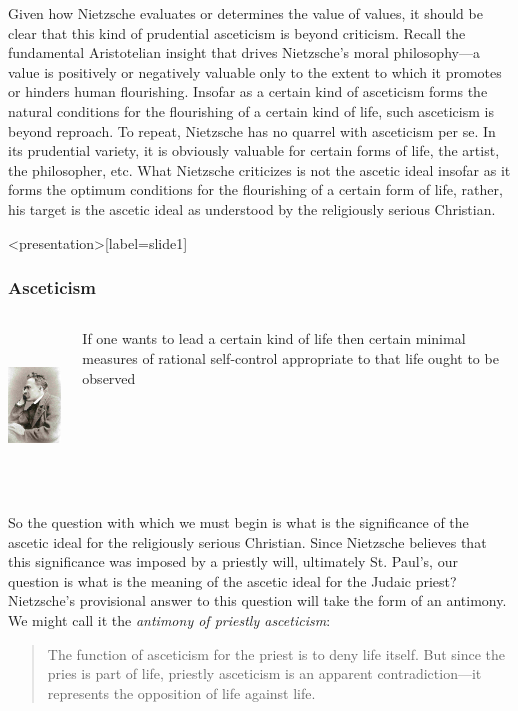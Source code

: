 Given how Nietzsche evaluates or determines the value of values, it should be clear that this kind of prudential asceticism is beyond criticism. Recall the fundamental Aristotelian insight that drives Nietzsche's moral philosophy---a value is positively or negatively valuable only to the extent to which it promotes or hinders human flourishing. Insofar as a certain kind of asceticism forms the natural conditions for the flourishing of a certain kind of life, such asceticism is beyond reproach. To repeat, Nietzsche has no quarrel with asceticism per se. In its prudential variety, it is obviously valuable for certain forms of life, the artist, the philosopher, etc. What Nietzsche criticizes is not the ascetic ideal insofar as it forms the optimum conditions for the flourishing of a certain form of life, rather, his target is the ascetic ideal as understood by the religiously serious Christian. \change

\begin{frame}<presentation>[label=slide1]
    \frametitle{Asceticism}
        \begin{columns}
            \begin{column}{3cm}
                \includegraphics[height=4cm]{../../graphics/nietzsche.jpg}
            \end{column}
            \begin{column}{7cm}
                If one wants to lead a certain kind of life then certain minimal measures of rational self-control appropriate to that life ought to be observed
            \end{column}
        \end{columns}
\end{frame}

So the question with which we must begin is what is the significance of the ascetic ideal for the religiously serious Christian. Since Nietzsche believes that this significance was imposed by a priestly will, ultimately St. Paul's, our question is what is the meaning of the ascetic ideal for the Judaic priest? Nietzsche's provisional answer to this question will take the form of an antimony. We might call it the \emph{antimony of priestly asceticism}:
\begin{quote}
    The function of asceticism for the priest is to deny life itself. But since the pries is part of life, priestly asceticism is an apparent contradiction---it represents the opposition of life against life.
\end{quote}


